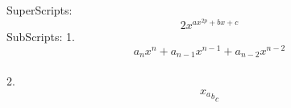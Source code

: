 \documentclass[12pt]{article}
\begin{document}
SuperScripts:
$$2x^{ax^{2p}+bx+c}$$
SubScripts:
1.$$a_nx^n+a_{n-1}x^{n-1}+a_{n-2}x^{n-2}$$\\
2.$${{x_a}_b}_c$$
\end{document}
